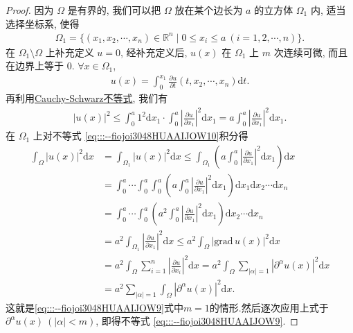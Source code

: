 \documentclass[../../main.tex]{subfiles}%
\begin{document}
\begin{proof}

因为 $\Omega$ 是有界的, 我们可以把 $\Omega$ 放在某个边长为 $a$ 的立方体 $\Omega_1$ 内, 适当选择坐标系, 使得
\begin{align*}
\Omega_1=\{(x_1,x_2,\cdots,x_n)\in\mathbb{R}^n\mid 0\leqslant x_i\leqslant a\ (i=1,2,\cdots,n)\}.
\end{align*}
在 $\Omega_1\setminus\Omega$ 上补充定义 $u=0$, 经补充定义后, $u(x)$ 在 $\Omega_1$ 上 $m$ 次连续可微, 而且在边界上等于 $0$. $\forall x\in\Omega_1$,
\begin{align*}
u(x)=\int_0^{x_1}\frac{\partial u}{\partial t}(t,x_2,\cdots,x_n)\mathrm{d}t.
\end{align*}
再利用\hyperref[theorem:泛函分析--Cauchy-Schwarz不等式]{Cauchy-Schwarz不等式}, 我们有
\begin{align}
|u(x)|^2\leqslant \int_0^a{1^2\mathrm{d}x_1}\cdot \int_0^a{\left| \frac{\partial u}{\partial x_1} \right|^2\mathrm{d}x_1}=a\int_0^a{\left| \frac{\partial u}{\partial x_1} \right|^2\mathrm{d}x_1}.\label{eq:::--fiojoi3048HUAAIJOW10}
\end{align}
在 $\Omega_1$ 上对不等式 \eqref{eq:::--fiojoi3048HUAAIJOW10}积分得
\begin{align*}
\int_{\Omega}{\left| u\left( x \right) \right|^2\mathrm{d}x}&=\int_{\Omega _1}{\left| u\left( x \right) \right|^2\mathrm{d}x}\leqslant \int_{\Omega _1}{\left( a\int_0^a{\left| \frac{\partial u}{\partial x_1} \right|^2\mathrm{d}x_1} \right) \mathrm{d}x}
\\
&=\int_0^a{\cdots \int_0^a{\int_0^a{\left( a\int_0^a{\left| \frac{\partial u}{\partial x_1} \right|^2\mathrm{d}x_1} \right) \mathrm{d}x_1\mathrm{d}x_2\cdots \mathrm{d}x_n}}}
\\
&=\int_0^a{\cdots \int_0^a{\left( a^2\int_0^a{\left| \frac{\partial u}{\partial x_1} \right|^2\mathrm{d}x_1} \right) \mathrm{d}x_2\cdots \mathrm{d}x_n}}
\\
&=a^2\int_{\Omega _1}{\left| \frac{\partial u}{\partial x_1} \right|^2\mathrm{d}x}\leqslant a^2\int_{\Omega}{\left| \mathrm{grad}\,u\left( x \right) \right|^2\mathrm{d}x}
\\
&=a^2\int_{\Omega}{\sum_{i=1}^n{\left| \frac{\partial u}{\partial x_i} \right|^2\mathrm{d}x}}=a^2\int_{\Omega}{\sum_{\left| \alpha \right|=1}{\left| \partial ^{\alpha}u\left( x \right) \right|^2}\mathrm{d}x}
\\
&=a^2\sum_{\left| \alpha \right|=1}{\int_{\Omega}{\left| \partial ^{\alpha}u\left( x \right) \right|^2\mathrm{d}x}}.
\end{align*}
这就是\eqref{eq:::--fiojoi3048HUAAIJOW9}式中$m=1$的情形.然后逐次应用上式于 $\partial^\alpha u(x)\ (|\alpha|<m)$, 即得不等式 \eqref{eq:::--fiojoi3048HUAAIJOW9}.

\end{proof}
\end{document}
